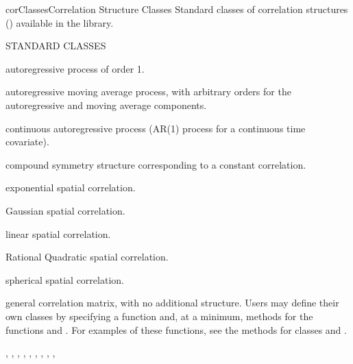 \documentclass[pdftex]{article} \usepackage{url,graphicx}
\begin{document}
\begin{Helpfile}{corClasses}{Correlation Structure Classes}
Standard classes of correlation structures ()
available in the  library.
\begin{Argument}{STANDARD CLASSES}
\item[\Co{corAR1:}]
autoregressive process of order 1.
\item[\Co{corARMA:}]
autoregressive moving average process, with arbitrary
orders for the autoregressive and moving average components.
\item[\Co{corCAR1:}]
continuous autoregressive process (AR(1) process for a
continuous time covariate).
\item[\Co{corCompSymm:}]
compound symmetry structure corresponding to a
constant correlation.
\item[\Co{corExp:}]
exponential spatial correlation.
\item[\Co{corGaus:}]
Gaussian spatial correlation.
\item[\Co{corLin:}]
linear spatial correlation.
\item[\Co{corRatio:}]
Rational Quadratic spatial correlation.
\item[\Co{corSpher:}]
spherical spatial correlation.
\item[\Co{corSymm:}]
general correlation matrix, with no additional
structure.
 Users may define their own  classes by specifying a
 function and, at a minimum, methods for the
functions  and . For
examples of these functions, see the methods for classes 
and .
\end{Argument}
, ,
, ,
, , 
, , , 
\end{Helpfile}
\end{document}
